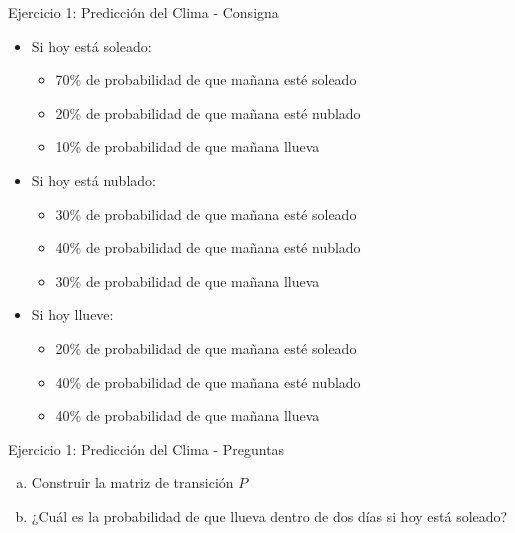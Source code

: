 \documentclass{beamer}
\begin{document}
\begin{frame}{Ejercicio 1: Predicción del Clima - Consigna}
    \begin{itemize}
        \item Si hoy está soleado:
            \begin{itemize}
                \item 70\% de probabilidad de que mañana esté soleado
                \item 20\% de probabilidad de que mañana esté nublado
                \item 10\% de probabilidad de que mañana llueva
            \end{itemize}
        \item Si hoy está nublado:
            \begin{itemize}
                \item 30\% de probabilidad de que mañana esté soleado
                \item 40\% de probabilidad de que mañana esté nublado
                \item 30\% de probabilidad de que mañana llueva
            \end{itemize}
        \item Si hoy llueve:
            \begin{itemize}
                \item 20\% de probabilidad de que mañana esté soleado
                \item 40\% de probabilidad de que mañana esté nublado
                \item 40\% de probabilidad de que mañana llueva
            \end{itemize}
    \end{itemize}
\end{frame}

\begin{frame}{Ejercicio 1: Predicción del Clima - Preguntas}
    \begin{enumerate}[a)]
        \item Construir la matriz de transición $P$
        \item ¿Cuál es la probabilidad de que llueva dentro de dos días si hoy está soleado?
    \end{enumerate}
\end{frame}
\end{document}
